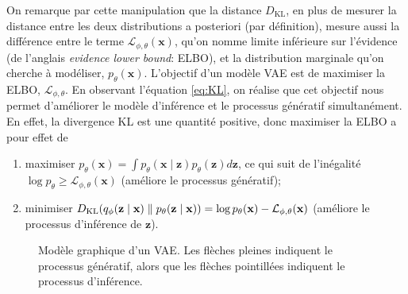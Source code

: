On remarque par cette manipulation que la distance $D_{\mathrm{KL}}$, en plus de mesurer la distance entre 
les deux distributions a posteriori (par définition), mesure aussi la différence entre le terme 
$\mathcal{L}_{\phi,\theta}(\mathbf{x})$, qu'on nomme limite inférieure sur l'évidence (de l'anglais 
\textit{evidence lower bound}: ELBO), et la distribution marginale qu'on cherche à modéliser, $p_\theta(\mathbf{x})$. 
L'objectif d'un modèle VAE est de maximiser la ELBO, $\mathcal{L_{\phi,\theta}}$. 
En observant l'équation \eqref{eq:KL}, on réalise que cet objectif 
nous permet d'améliorer le modèle d'inférence et le processus génératif simultanément.
En effet, la divergence KL est 
une quantité positive, donc maximiser la ELBO a pour effet de
\begin{enumerate}
        \item maximiser $p_\theta(\mathbf{x}) = \int p_{\theta}(\mathbf{x} \mid \mathbf{z}) p_{\theta}(\mathbf{z}) d\mathbf{z}$, ce qui suit de l'inégalité
                $\log p_\theta \geq \mathcal{L}_{\phi,\theta}(\mathbf{x})$ (améliore le processus génératif);
        \item minimiser $D_{\mathrm{KL}}(q_\phi(\mathbf{z} \mid \mathbf{x}) \mathrel{\Vert}  p_\theta (\mathbf{z} \mid \mathbf{x})) = \log p_\theta(\mathbf{x}) - \mathcal{L}_{\phi,\theta}(\mathbf{x})$ (améliore le processus d'inférence de $\mathbf{z}$).
\end{enumerate}

\begin{figure}[H]
        \centering
        \caption{Modèle graphique d'un VAE. Les flèches pleines indiquent le processus génératif, alors que les flèches pointillées indiquent le processus d'inférence.}
        \label{fig:vae encoder}
\end{figure}

